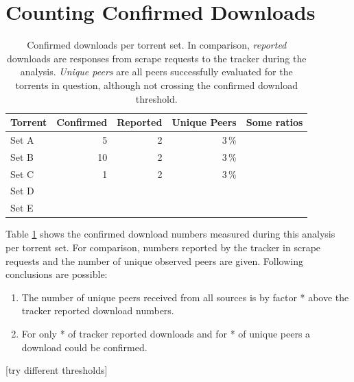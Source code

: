 \documentclass[10pt, a4paper, twoside, headsepline]{scrbook}
\renewcommand{\_}{\origunderscore\allowbreak}
\begin{document}
\section{Counting Confirmed Downloads}
\begin{table}
\centering
\begin{tabular}{lrrrr}
\toprule
Torrent & Confirmed & Reported & Unique Peers & Some ratios \\
\midrule
Set A & 5 & 2 & 3\,\% \\
Set B & 10 & 2 & 3\,\% \\
Set C & 1 & 2 & 3\,\% \\
Set D & \\
Set E & \\
\bottomrule
\end{tabular}
\caption[Confirmed downloads per torrent set]{Confirmed downloads per torrent set. In comparison, \emph{reported} downloads are responses from scrape requests to the tracker during the analysis. \emph{Unique peers} are all peers successfully evaluated for the torrents in question, although not crossing the confirmed download threshold.}
\label{confirmed-downloads}
\end{table}

Table \ref{confirmed-downloads} shows the confirmed download numbers measured during this analysis per torrent set. For comparison, numbers reported by the tracker in scrape requests and the number of unique observed peers are given. Following conclusions are possible:
\begin{enumerate}
\item The number of unique peers received from all sources is by factor * above the tracker reported download numbers.
\item For only * of tracker reported downloads and for * of unique peers a download could be confirmed.
\end{enumerate}

[try different thresholds]
\end{document}
